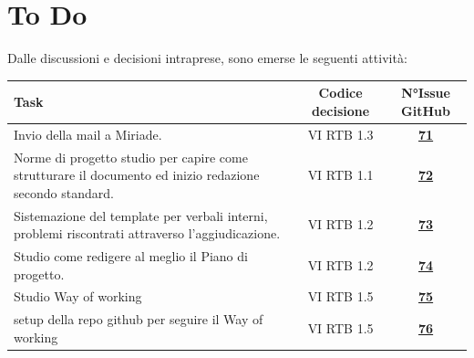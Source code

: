 \documentclass[a4paper,12pt]{article}
\newcommand{\ignoreglossary}{}
\begin{document}
\section{To Do}
Dalle discussioni e decisioni intraprese, sono emerse le seguenti attività:

\begin{center}
\small
\renewcommand{\arraystretch}{1.2} 
\begin{tabular}{|p{}|c|c|}
\hline
\rowcolor{gray!60} 
\textbf{Task} & \textbf{Codice decisione} & \textbf{N°Issue GitHub} \\
\hline
\rowcolor{white}
Invio della mail a Miriade. & VI \ignoreglossary{RTB} 1.3 & \href{https://github.com/SWE-BitByBit/SWE-project/issues/71}{\textbf{71}} \\
\hline
\rowcolor{gray!20}
Norme di progetto studio per capire come strutturare il documento ed inizio redazione secondo standard. & VI \ignoreglossary{RTB} 1.1 & \href{https://github.com/SWE-BitByBit/SWE-project/issues/72}{\textbf{72}} \\
\hline
\rowcolor{white}
Sistemazione del template per verbali interni, problemi riscontrati attraverso l’aggiudicazione. & VI \ignoreglossary{RTB} 1.2 & \href{https://github.com/SWE-BitByBit/SWE-project/issues/73}{\textbf{73}} \\
\hline
\rowcolor{gray!20}
Studio come redigere al meglio il Piano di progetto. & VI \ignoreglossary{RTB} 1.2 & \href{https://github.com/SWE-BitByBit/SWE-project/issues/74}{\textbf{74}} \\
\hline
\rowcolor{white}
Studio Way of working & VI \ignoreglossary{RTB} 1.5 & \href{https://github.com/SWE-BitByBit/SWE-project/issues/75}{\textbf{75}} \\
\hline
\rowcolor{gray!20}
setup della repo github per seguire il Way of working & VI \ignoreglossary{RTB} 1.5 & \href{https://github.com/SWE-BitByBit/SWE-project/issues/76}{\textbf{76}} \\
\hline
\end{tabular}
\end{center}
\end{document}
